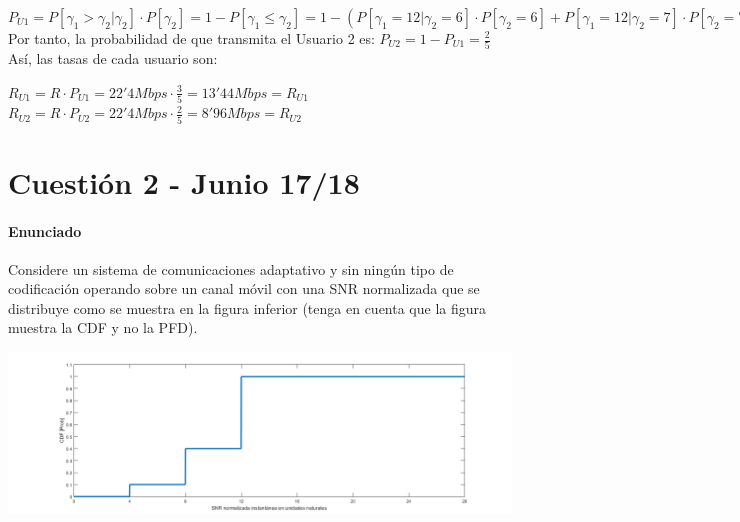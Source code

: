 \documentclass[fleqn,14pt]{article}
\begin{document}
\begin{enumerate}[a)]
\begin{enumerate}[1.]
    $P_{U1} = P[\gamma_1 > \gamma_2 | \gamma_2] \cdot P[\gamma_2] = 1 - P[\gamma_1 \leq \gamma_2] = 1 - (P[\gamma_1 = 12 | \gamma_2 = 6] \cdot P[\gamma_2 = 6] +   P[\gamma_1 = 12 | \gamma_2 = 7] \cdot   P[\gamma_2 = 7] + P[\gamma_1 = 12 | \gamma_2 = 10] \cdot P[\gamma_2 = 10] ) = 1 - ( \frac{2}{5}\cdot \frac{3}{5} + \frac{2}{5}\cdot \frac{1}{5}  + \frac{2}{5}\cdot \frac{1}{5} = \frac{3}{5} = P_{U1}$
    \newline
    \newline
    Por tanto, la probabilidad de que transmita el Usuario 2 es: $P_{U2} = 1 - P_{U1} = \frac{2}{5}$
    \newline
    Así, las tasas de cada usuario son:
    \begin{center}
      $R_{U1} = R \cdot P_{U1} = 22'4 Mbps \cdot \frac{3}{5} = \boxed{13'44 Mbps = R_{U1}}$\\
      $R_{U2} = R \cdot P_{U2} = 22'4 Mbps \cdot \frac{2}{5} = \boxed{8'96 Mbps = R_{U2}}$
    \end{center}
  \end{enumerate}
\end{enumerate}

\newpage



\section*{Cuesti\'on 2 \-- Junio 17/18 }
\paragraph{Enunciado}
Considere un sistema de comunicaciones adaptativo y sin ningún tipo de codificación operando sobre un canal móvil con una SNR normalizada que se distribuye como se muestra en la figura inferior (tenga en cuenta que la figura muestra la CDF y no la PFD).


\centering
\includegraphics[scale=0.35]{images/imagen}
\raggedright
\end{document}
